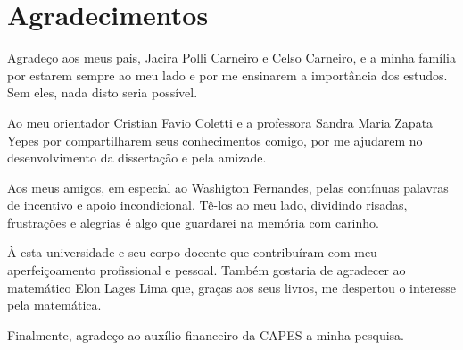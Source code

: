 \chapter*{Agradecimentos}

Agradeço aos meus pais, Jacira Polli Carneiro e Celso Carneiro, e a minha 
família por estarem sempre
ao meu lado e por me ensinarem a importância dos estudos. Sem eles, nada disto
seria possível.

Ao meu orientador Cristian Favio Coletti e a professora Sandra Maria Zapata Yepes
por compartilharem seus conhecimentos comigo, por me ajudarem no desenvolvimento
da dissertação e pela amizade.

Aos meus amigos, em especial ao Washigton Fernandes, 
pelas contínuas palavras de incentivo e apoio incondicional. 
Tê-los ao meu lado, dividindo risadas, frustrações e alegrias é
algo que guardarei na memória com carinho.

À esta universidade e seu corpo docente que contribuíram com meu aperfeiçoamento
profissional e pessoal. Também gostaria de agradecer ao matemático
Elon Lages Lima que, graças aos seus livros, me despertou o interesse pela matemática.


Finalmente, agradeço ao auxílio financeiro da CAPES a minha pesquisa.

